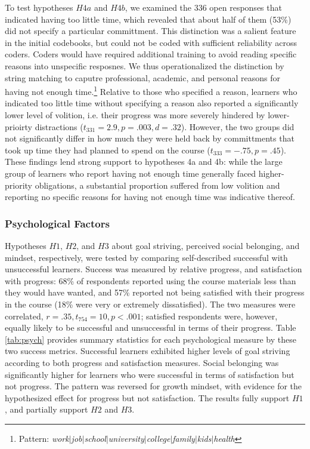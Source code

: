 \documentclass{sigchi}\usepackage[]{graphicx}\usepackage[]{color}
\begin{document}
To test hypotheses $H4a$ and $H4b$, we examined the 336 open responses that indicated having too little time, which revealed that about half of them (53\%) did not specify a particular committment. This distinction was a salient feature in the initial codebooks, but could not be coded with sufficient reliability across coders. Coders would have required additional training to avoid reading specific reasons into unspecific resposnes. We thus operationalized the distinction by string matching to caputre professional, academic, and personal reasons for having not enough time.\footnote{Pattern: {\em work$|$job$|$school$|$university$|$college$|$family$|$kids$|$health}} Relative to those who specified a reason, learners who indicated too little time without specifying a reason also reported a significantly lower level of volition, i.e. their progress was more severely hindered by lower-prioirty distractions ($t_{331}=2.9, p=.003, d=.32$). However, the two groups did not significantly differ in how much they were held back by committments that took up time they had planned to spend on the course ($t_{333}=-.75, p=.45$). These findings lend strong support to hypotheses 4a and 4b: while the large group of learners who report having not enough time generally faced higher-priority obligations, a substantial proportion suffered from low volition and reporting no specific reasons for having not enough time was indicative thereof.

\subsubsection{Psychological Factors}

Hypotheses $H1$, $H2$, and $H3$ about goal striving, perceived social belonging, and mindset, respectively, were tested by comparing self-described successful with unsuccessful learners. Success was measured by relative progress, and satisfaction with progress: 68\% of respondents reported using the course materials less than they would have wanted, and 57\% reported not being satisfied with their progress in the course (18\% were very or extremely dissatisfied). The two measures were correlated, $r=.35, t_{754}=10, p<.001$; satisfied respondents were, however, equally likely to be successful and unsuccessful in terms of their progress. Table \ref{tab:psych} provides summary statistics for each psychological measure by these two success metrics. Successful learners exhibited higher levels of goal striving according to both progress and satisfaction measures. Social belonging was significantly higher for learners who were successful in terms of satisfaction but not progress. The pattern was reversed for growth mindset, with evidence for the hypothesized effect for progress but not satisfaction. The results fully support $H1$, and partially support $H2$ and $H3$.
\end{document}
